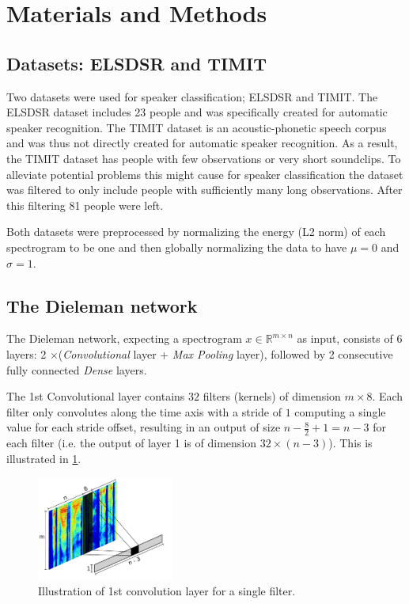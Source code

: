 \section{Materials and Methods}

\subsection{Datasets: ELSDSR and TIMIT}

Two datasets were used for speaker classification; ELSDSR and TIMIT. The ELSDSR dataset includes 23 people and was specifically created for automatic speaker recognition. The TIMIT dataset is an acoustic-phonetic speech corpus and was thus not directly created for automatic speaker recognition. As a result, the TIMIT dataset has people with few observations or very short soundclips. To alleviate potential problems this might cause for speaker classification the dataset was filtered to only include people with sufficiently many long observations. After this filtering 81 people were left.

Both datasets were preprocessed by normalizing the energy (L2 norm) of each spectrogram to be one and then globally normalizing the data to have $\mu = 0$ and $\sigma = 1$.

\subsection{The Dieleman network}

The Dieleman network, expecting a spectrogram $x \in \mathbb{R}^{m \times n}$ as input, consists of 6 layers: 2 $\times$(\emph{Convolutional} layer + \emph{Max Pooling} layer), followed by 2 consecutive fully connected \emph{Dense} layers.

The 1st Convolutional layer contains $32$ filters (kernels) of dimension $m \times 8$. Each filter only convolutes along the time axis with a stride of $1$ computing a single value for each stride offset, resulting in an output of size $n - \frac{8}{2} + 1 = n - 3$ for each filter (i.e. the output of layer 1 is of dimension $32 \times (n-3)$). This is illustrated in \cref{fig:convolution-1}.

\begin{figure}[H]
  \centering
  \includegraphics[width=0.4\textwidth]{inkscape/convolution.pdf}
  \caption{Illustration of 1st convolution layer for a single filter.}
  \label{fig:convolution-1}
\end{figure}

